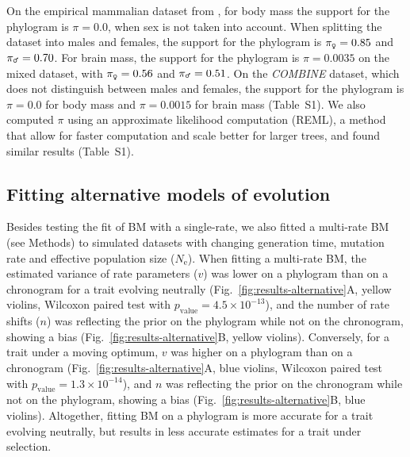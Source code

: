 \documentclass{article}
\newcommand{\Ne}{N_{\text{e}}}
\newcommand{\PhyloSupport}{\pi}
\begin{document}
On the empirical mammalian dataset from \citet{tsuboi_breakdown_2018}, for body mass the support for the phylogram is $\PhyloSupport = 0.0$, when sex is not taken into account.
When splitting the dataset into males and females, the support for the phylogram is $\PhyloSupport_{\text{\Female}} = 0.85$ and $\PhyloSupport_{\text{\Male}} = 0.70$.
For brain mass, the support for the phylogram is $\PhyloSupport = 0.0035$ on the mixed dataset, with $\PhyloSupport_{\text{\Female}} = 0.56$ and $\PhyloSupport_{\text{\Male}} = 0.51$.
On the \textit{COMBINE} dataset, which does not distinguish between males and females, the support for the phylogram is $\PhyloSupport = 0.0$ for body mass and $\PhyloSupport = 0.0015$ for brain mass (Table~S1).
We also computed $\PhyloSupport$ using an approximate likelihood computation (REML), a method that allow for faster computation and scale better for larger trees, and found similar results (Table~S1).

\subsection*{Fitting alternative models of evolution}
Besides testing the fit of BM with a single-rate, we also fitted a multi-rate BM (see Methods) to simulated datasets with changing generation time, mutation rate and effective population size ($\Ne$).
When fitting a multi-rate BM, the estimated variance of rate parameters ($v$) was lower on a phylogram than on a chronogram for a trait evolving neutrally (Fig.~\ref{fig:results-alternative}A, yellow violins, Wilcoxon paired test with $p_{\text{value}}=4.5\times 10^{-13}$), and the number of rate shifts ($n$) was reflecting the prior on the phylogram while not on the chronogram, showing a bias (Fig.~\ref{fig:results-alternative}B, yellow violins).
Conversely, for a trait under a moving optimum, $v$ was higher on a phylogram than on a chronogram (Fig.~\ref{fig:results-alternative}A, blue violins, Wilcoxon paired test with  $p_{\text{value}}=1.3\times 10^{-14}$), and $n$ was reflecting the prior on the chronogram while not on the phylogram, showing a bias (Fig.~\ref{fig:results-alternative}B, blue violins).
Altogether, fitting BM on a phylogram is more accurate for a trait evolving neutrally, but results in less accurate estimates for a trait under selection.
\end{document}
